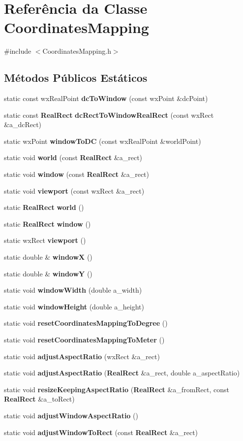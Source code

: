 \section{Referência da Classe Coordinates\+Mapping}
\label{class_coordinates_mapping}


{\ttfamily \#include $<$Coordinates\+Mapping.\+h$>$}

\subsection*{Métodos Públicos Estáticos}
\begin{DoxyCompactItemize}
\item 
static const wx\+Real\+Point {\bf dc\+To\+Window} (const wx\+Point \&dc\+Point)
\item 
static const {\bf Real\+Rect} {\bf dc\+Rect\+To\+Window\+Real\+Rect} (const wx\+Rect \&a\+\_\+dc\+Rect)
\item 
static wx\+Point {\bf window\+To\+DC} (const wx\+Real\+Point \&world\+Point)
\item 
static void {\bf world} (const {\bf Real\+Rect} \&a\+\_\+rect)
\item 
static void {\bf window} (const {\bf Real\+Rect} \&a\+\_\+rect)
\item 
static void {\bf viewport} (const wx\+Rect \&a\+\_\+rect)
\item 
static {\bf Real\+Rect} {\bf world} ()
\item 
static {\bf Real\+Rect} {\bf window} ()
\item 
static wx\+Rect {\bf viewport} ()
\item 
static double \& {\bf windowX} ()
\item 
static double \& {\bf windowY} ()
\item 
static void {\bf window\+Width} (double a\+\_\+width)
\item 
static void {\bf window\+Height} (double a\+\_\+height)
\item 
static void {\bf reset\+Coordinates\+Mapping\+To\+Degree} ()
\item 
static void {\bf reset\+Coordinates\+Mapping\+To\+Meter} ()
\item 
static void {\bf adjust\+Aspect\+Ratio} (wx\+Rect \&a\+\_\+rect)
\item 
static void {\bf adjust\+Aspect\+Ratio} ({\bf Real\+Rect} \&a\+\_\+rect, double a\+\_\+aspect\+Ratio)
\item 
static void {\bf resize\+Keeping\+Aspect\+Ratio} ({\bf Real\+Rect} \&a\+\_\+from\+Rect, const {\bf Real\+Rect} \&a\+\_\+to\+Rect)
\item 
static void {\bf adjust\+Window\+Aspect\+Ratio} ()
\item 
static void {\bf adjust\+Window\+To\+Rect} (const {\bf Real\+Rect} \&a\+\_\+rect)
\end{DoxyCompactItemize}
